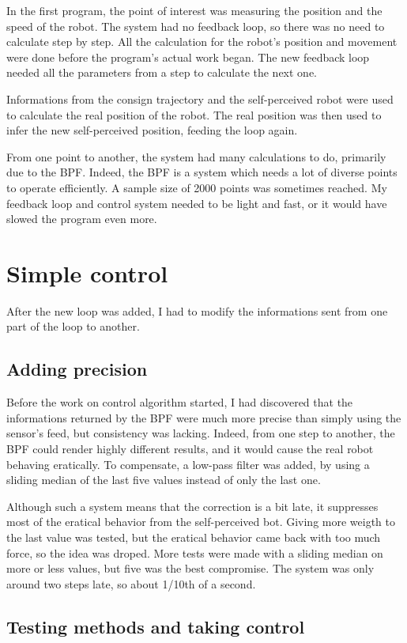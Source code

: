 In the first program, the point of interest was measuring the position and the speed of the robot.
The system had no feedback loop, so there was no need to calculate step by step. All the calculation for the robot's position and movement were done before the program's actual work began.
The new feedback loop needed all the parameters from a step to calculate the next one.

Informations from the consign trajectory and the self-perceived robot were used to calculate the real position of the robot.
The real position was then used to infer the new self-perceived position, feeding the loop again.

From one point to another, the system had many calculations to do, primarily due to the BPF.
Indeed, the BPF is a system which needs a lot of diverse points to operate efficiently. A sample size of 2000 points was sometimes reached.
My feedback loop and control system needed to be light and fast, or it would have slowed the program even more.


\section{Simple control}
After the new loop was added, I had to modify the informations sent from one part of the loop to another.

\subsection{Adding precision}
Before the work on control algorithm started, I had discovered that the informations returned by the BPF were much more precise than simply using the sensor's feed, but consistency was lacking.
Indeed, from one step to another, the BPF could render highly different results, and it would cause the real robot behaving eratically.
To compensate, a low-pass filter was added, by using a sliding median of the last five values instead of only the last one.

Although such a system means that the correction is a bit late, it suppresses most of the eratical behavior from the self-perceived bot.
Giving more weigth to the last value was tested, but the eratical behavior came back with too much force, so the idea was droped.
More tests were made with a sliding median on more or less values, but five was the best compromise.
The system was only around two steps late, so about 1/10th of a second.

\subsection{Testing methods and taking control}

